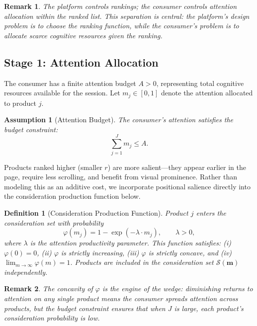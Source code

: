 \documentclass[12pt]{article}
\newtheorem{assumption}{Assumption}
\newtheorem{definition}{Definition}
\newtheorem{remark}{Remark}
\begin{document}
\begin{remark}
The platform controls rankings; the consumer controls attention allocation \emph{within} the ranked list. This separation is central: the platform's design problem is to choose the ranking function, while the consumer's problem is to allocate scarce cognitive resources given the ranking.
\end{remark}

\subsection{Stage 1: Attention Allocation}\label{sec:attention}

The consumer has a finite attention budget $A > 0$, representing total cognitive resources available for the session. Let $m_j \in [0,1]$ denote the attention allocated to product $j$.

\begin{assumption}[Attention Budget]\label{a:budget}
The consumer's attention satisfies the budget constraint:
\begin{equation}\label{eq:budget}
    \sum_{j=1}^{J} m_j \leq A.
\end{equation}
\end{assumption}

Products ranked higher (smaller $r$) are more salient---they appear earlier in the page, require less scrolling, and benefit from visual prominence. Rather than modeling this as an additive cost, we incorporate positional salience directly into the consideration production function below.

\begin{definition}[Consideration Production Function]\label{def:consideration}
Product $j$ enters the consideration set with probability
\begin{equation}\label{eq:consideration}
    \varphi(m_j) = 1 - \exp(-\lambda \cdot m_j), \qquad \lambda > 0,
\end{equation}
where $\lambda$ is the \emph{attention productivity} parameter. This function satisfies: (i) $\varphi(0) = 0$, (ii) $\varphi$ is strictly increasing, (iii) $\varphi$ is strictly concave, and (iv) $\lim_{m \to \infty}\varphi(m) = 1$. Products are included in the consideration set $\mathcal{S}(\mathbf{m})$ independently.
\end{definition}

\begin{remark}
The concavity of $\varphi$ is the engine of the wedge: diminishing returns to attention on any single product means the consumer spreads attention across products, but the budget constraint ensures that when $J$ is large, each product's consideration probability is low.
\end{remark}
\end{document}
